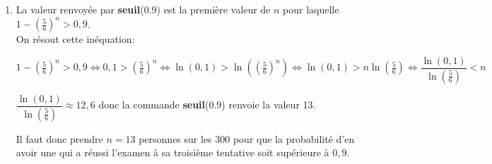 \begin{enumerate}
\begin{enumerate}
		\item 
La valeur renvoyée par \textbf{seuil}(0.9) est la première valeur de $n$ pour laquelle $1-\left (\frac{5}{6}\right )^n >0,9$. \\
On résout cette inéquation:
		
$1-\left (\frac{5}{6}\right )^n >0,9
\iff 
0,1 > \left (\frac{5}{6}\right )^n
\iff
\ln(0,1) > \ln\left (\left (\frac{5}{6}\right )^n\right )
\iff
\ln(0,1) > n\ln\left (\frac{5}{6}\right )
\iff
\dfrac{\ln(0,1)}{\ln\left (\frac{5}{6}\right )} < n
$		

$\dfrac{\ln(0,1)}{\ln\left (\frac{5}{6}\right )}\approx 12,6$ donc la commande \textbf{seuil}(0.9) renvoie la valeur 13.

Il faut donc prendre $n=13$ personnes sur les 300 pour que la probabilité d'en avoir une qui a réussi l'examen à sa troisième tentative soit supérieure à $0,9$.
		
		
	\end{enumerate}
\end{enumerate}

